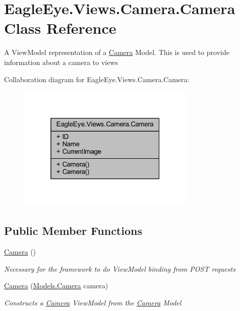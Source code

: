 \hypertarget{class_eagle_eye_1_1_views_1_1_camera_1_1_camera}{}\section{Eagle\+Eye.\+Views.\+Camera.\+Camera Class Reference}
\label{class_eagle_eye_1_1_views_1_1_camera_1_1_camera}


A View\+Model representation of a \mbox{\hyperlink{class_eagle_eye_1_1_views_1_1_camera_1_1_camera}{Camera}} Model. This is used to provide information about a camera to views  




Collaboration diagram for Eagle\+Eye.\+Views.\+Camera.\+Camera\+:\nopagebreak
\begin{figure}[H]
\begin{center}
\leavevmode
\includegraphics[width=241pt]{class_eagle_eye_1_1_views_1_1_camera_1_1_camera__coll__graph}
\end{center}
\end{figure}
\subsection*{Public Member Functions}
\begin{DoxyCompactItemize}
\item 
\mbox{\hyperlink{class_eagle_eye_1_1_views_1_1_camera_1_1_camera_ab3ccc315a6ac49b823bcb2985f20ec0b}{Camera}} ()
\begin{DoxyCompactList}\small\item\em Necessary for the framework to do View\+Model binding from P\+O\+ST requests \end{DoxyCompactList}\item 
\mbox{\hyperlink{class_eagle_eye_1_1_views_1_1_camera_1_1_camera_a346c5d9185abc85856b4fba46edaf101}{Camera}} (\mbox{\hyperlink{class_eagle_eye_1_1_models_1_1_camera}{Models.\+Camera}} camera)
\begin{DoxyCompactList}\small\item\em Constructs a \mbox{\hyperlink{class_eagle_eye_1_1_views_1_1_camera_1_1_camera}{Camera}} View\+Model from the \mbox{\hyperlink{class_eagle_eye_1_1_views_1_1_camera_1_1_camera}{Camera}} Model \end{DoxyCompactList}\end{DoxyCompactItemize}

